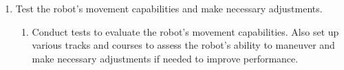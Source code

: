 \documentclass{article}
\begin{document}
\begin{enumerate}
\begin{enumerate}
\item 
Test the robot’s movement capabilities and make necessary adjustments.
\begin{enumerate}
    \item Conduct tests to evaluate the robot's movement capabilities. Also set up various tracks and courses to assess the robot’s ability to maneuver and make necessary adjustments if needed to improve performance.
\end{enumerate}

\end{enumerate}



\end{enumerate}
\end{document}
